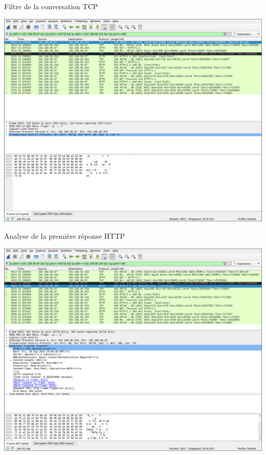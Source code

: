 \documentclass[10pt,sans,usenames,dvipsnames,french,compress]{beamer}
\begin{document}
\begin{frame}{Filtre de la conversation TCP}
	\begin{center}
		\includegraphics[width=0.8\linewidth]{118/wireshark4}
	\end{center}
\end{frame}

\begin{frame}{Analyse de la première réponse HTTP}
	\begin{center}
		\includegraphics[width=0.8\linewidth]{118/wireshark5}
	\end{center}
\end{frame}
\end{document}
